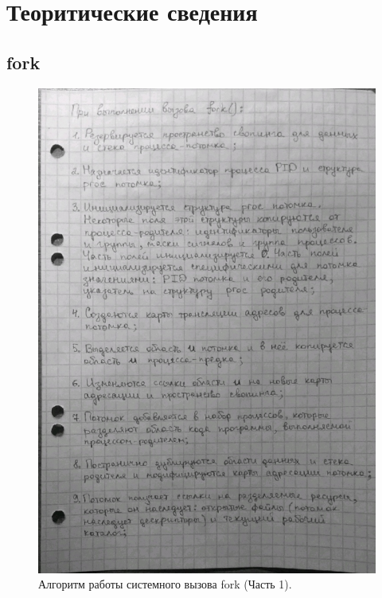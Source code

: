\chapter{Теоритические сведения}

\section{fork}

\begin{figure}[ht]
	\centering
	\includegraphics[width=0.7\linewidth]{img/fork1.jpg}
	\caption{Алгоритм работы системного вызова fork (Часть 1).}
\end{figure}

